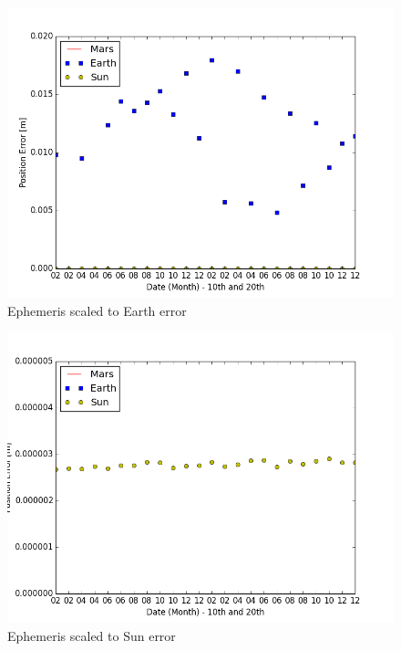 \documentclass[]{BasiliskReportMemo}
\begin{document}
\begin{figure}[htb]
	\centerline{
	\includegraphics[scale=0.65]{Figures/EphemEarth.png}
	}
	\caption{Ephemeris scaled to Earth error}
	\label{fig:EphemEarth}
\end{figure}

\begin{figure}[htb]
	\centerline{
	\includegraphics[scale=0.65]{Figures/EphemSun.png}
	}
	\caption{Ephemeris scaled to Sun error}
	\label{fig:EphemSun}
\end{figure}
\end{document}
